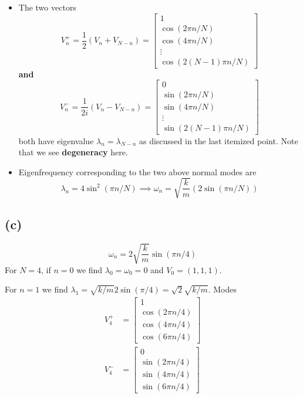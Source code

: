 \documentclass[letter, 10pts]{article}
\begin{document}
\begin{itemize}
\item The two vectors 
	\[
		V^{+}_n = \frac{1}{2} \left(V_n + V_{N-n}\right) = 
		\begin{bmatrix} 1 \\ 
		\cos(2 \pi n  / N) \\ 
	\cos (4 \pi n / N) \\ 
\vdots 
\\
\cos (2 (N-1) \pi n / N )\end{bmatrix} 
	\] 
	\textbf{and}
	\[
		V^{-}_n = \frac{1}{2 i} (V_n - V_{N-n}) = 
		\begin{bmatrix} 0 \\ 
		\sin(2 \pi n / N) \\ 
	\sin (4 \pi n / N ) \\ 
\vdots 
\\ 
\sin(2 (N-1) \pi n / N)\end{bmatrix} 
\] both have eigenvalue $\lambda_n = \lambda_{N-n}$ as discussed in the last itemized point. Note that we see \textbf{degeneracy} here. 
\item Eigenfrequency corresponding to the two above normal modes are 
	\[
		\lambda_n = 4 \sin ^2 (\pi n  / N) \implies\omega_n = \sqrt{ \frac{k}{m}} (2 \sin (\pi n / N))
	\] 
\end{itemize}



\subsection*{(c)}
\[
\omega_n = 2 \sqrt{\frac{k}{m}} \sin(\pi n / 4)
\] 
For $N =4$, if $n= 0$ we find $\lambda_0 =\omega_0= 0$ and $V_0 = (1,1,1)$.

For $n = 1$ we find $\lambda_1 = \sqrt{k / m}   2 \sin(\pi /4 ) = \sqrt{2}  \sqrt{k / m}  $. Modes
\begin{align*}
	V^{+}_4 &= 
		\begin{bmatrix} 1 \\ 
		\cos(2 \pi n  / 4) \\ 
	\cos (4 \pi n / 4) \\ 
\cos (6 \pi n / 4 )\end{bmatrix} 
		\\
	V^{-}_4 &= 
		\begin{bmatrix} 0 \\ 
		\sin(2 \pi n / 4) \\ 
	\sin (4 \pi n / 4 ) \\ 
\sin(6 \pi n / 4)\end{bmatrix} 
\end{align*}
\end{document}
